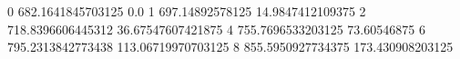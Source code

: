 0 682.1641845703125 0.0
1 697.14892578125 14.9847412109375
2 718.8396606445312 36.67547607421875
4 755.7696533203125 73.60546875
6 795.2313842773438 113.06719970703125
8 855.5950927734375 173.430908203125
